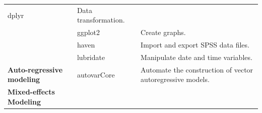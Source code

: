 \documentclass[]{book}
\begin{document}
\begin{longtable}[]{@{}lll@{}}
\begin{minipage}[t]{0.23\columnwidth}
dplyr\strut
\end{minipage} & \begin{minipage}[t]{0.48\columnwidth}\raggedright\strut
Data transformation.\strut
\end{minipage}\tabularnewline
\begin{minipage}[t]{0.21\columnwidth}\raggedright\strut
\strut
\end{minipage} & \begin{minipage}[t]{0.23\columnwidth}\raggedright\strut
ggplot2\strut
\end{minipage} & \begin{minipage}[t]{0.48\columnwidth}\raggedright\strut
Create graphs.\strut
\end{minipage}\tabularnewline
\begin{minipage}[t]{0.21\columnwidth}\raggedright\strut
\strut
\end{minipage} & \begin{minipage}[t]{0.23\columnwidth}\raggedright\strut
haven\strut
\end{minipage} & \begin{minipage}[t]{0.48\columnwidth}\raggedright\strut
Import and export SPSS data files.\strut
\end{minipage}\tabularnewline
\begin{minipage}[t]{0.21\columnwidth}\raggedright\strut
\strut
\end{minipage} & \begin{minipage}[t]{0.23\columnwidth}\raggedright\strut
lubridate\strut
\end{minipage} & \begin{minipage}[t]{0.48\columnwidth}\raggedright\strut
Manipulate date and time variables.\strut
\end{minipage}\tabularnewline
\begin{minipage}[t]{0.21\columnwidth}\raggedright\strut
\textbf{Auto-regressive modeling}\strut
\end{minipage} & \begin{minipage}[t]{0.23\columnwidth}\raggedright\strut
autovarCore\strut
\end{minipage} & \begin{minipage}[t]{0.48\columnwidth}\raggedright\strut
Automate the construction of vector autoregressive models.\strut
\end{minipage}\tabularnewline
\begin{minipage}[t]{0.21\columnwidth}\raggedright\strut
\textbf{Mixed-effects Modeling}\strut
\end{minipage} & \begin{minipage}[t]{0.23\columnwidth}\raggedright\strut

\end{minipage}
\end{longtable}
\end{document}
